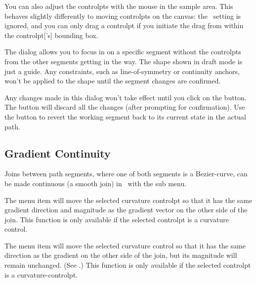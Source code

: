 You can also adjust the \glspl{controlpt} with the mouse in the
sample area. This behaves slightly differently to moving
\glspl{controlpt} on the \gls{canvas}: the \gridlock\ setting is
ignored, and you can only drag a \gls{controlpt} if you initiate the
drag from within the \gls{controlpt}['s] bounding box.

\begin{information}
The  dialog allows you to focus in on a specific
segment without the \glspl{controlpt} from the other segments
getting in the way. The \gls{shape} shown in draft mode is just a
guide. Any constraints, such as \gls{line-of-symmetry} or
\gls{continuity} \glspl{anchor}, won't be applied to the
\gls{shape} until the segment changes are confirmed.
\end{information}

Any changes made in this dialog won't take effect until you click on
the  button. The  button will discard all the
changes (after prompting for confirmation). Use the 
 button to revert the working segment
back to its current state in the actual path.

\subsection{Gradient Continuity}\label{sec:continuity}

Joins between \gls{path} segments, where one of both segments is a
\gls{Bezier-curve}, can be made continuous (a smooth join)
in \editpathmode\ with the  sub menu.


The  menu item will move the selected
curvature \gls*{controlpt} so that it has the same gradient
direction and magnitude as the gradient vector on the other side of
the join.
This function is only available if the selected \gls{controlpt} is
a curvature control.


The  menu item will move the
selected curvature control so that it has the same direction as the
gradient on the other side of the join, but its magnitude will
remain unchanged. (See .)
This function is only available if the selected \gls{controlpt} is
a \gls{curvature-controlpt}.


